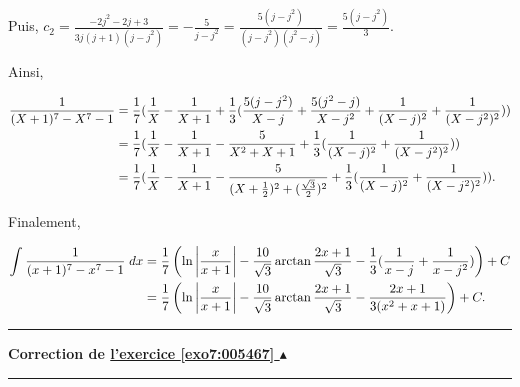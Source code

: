 \documentclass[11pt,a4paper]{article}
\newcommand{\Arctan}{\mathop{\mathrm{arctan}}\nolimits}
\newcounter{exo}
\newcommand{\correction}[1]{\hypertarget{cor7:#1}{}\label{cor7:#1}{\bf Correction de \hyperlink{exo7:#1}{l'exercice \ref{exo7:#1} $\blacktriangle$}}\vspace{1mm}\hrule\vspace{1mm}}
\newcommand{\fincorrection}{\vspace{1mm}\hrule\vspace*{7mm}}
\begin{document}
\begin{enumerate}
Puis, $c_2=\frac{-2j^2-2j+3}{3j(j+1)(j-j^2)}=-\frac{5}{j-j^2}=\frac{5(j-j^2)}{(j-j^2)(j^2-j)}=\frac{5(j-j^2)}{3}$.

Ainsi,

\begin{align*}\ensuremath
\frac{1}{(X+1)^7-X^7-1}&=\frac{1}{7}
(\frac{1}{X}-\frac{1}{X+1}+\frac{1}{3}(\frac{5(j-j^2)}{X-j}+\frac{5(j^2-j)}{X-j^2}+\frac{1}{(X-j)^2}+\frac{1}{(X-j^2)^2}))\\
 &=\frac{1}{7}
(\frac{1}{X}-\frac{1}{X+1}-\frac{5}{X^2+X+1}+\frac{1}{3}(\frac{1}{(X-j)^2}+\frac{1}{(X-j^2)^2}))\\
 &=\frac{1}{7}
(\frac{1}{X}-\frac{1}{X+1}-\frac{5}{(X+\frac{1}{2})^2+(\frac{\sqrt{3}}{2})^2}+\frac{1}{3}(\frac{1}{(X-j)^2}+\frac{1}{(X-j^2)^2})).
\end{align*}

Finalement,

\begin{align*}\ensuremath
\int_{}^{}\frac{1}{(x+1)^7-x^7-1}\;dx&=\frac{1}{7}\left(\ln\left|\frac{x}{x+1}\right|-\frac{10}{\sqrt{3}}
\Arctan\frac{2x+1}{\sqrt{3}}-\frac{1}{3}(\frac{1}{x-j}+\frac{1}{x-j^2})\right)+C\\
 &=\frac{1}{7}\left(\ln\left|\frac{x}{x+1}\right|-\frac{10}{\sqrt{3}}
\Arctan\frac{2x+1}{\sqrt{3}}-\frac{2x+1}{3(x^2+x+1)}\right)+C.
\end{align*}

\end{enumerate}
\fincorrection
\correction{005467}
\end{document}
